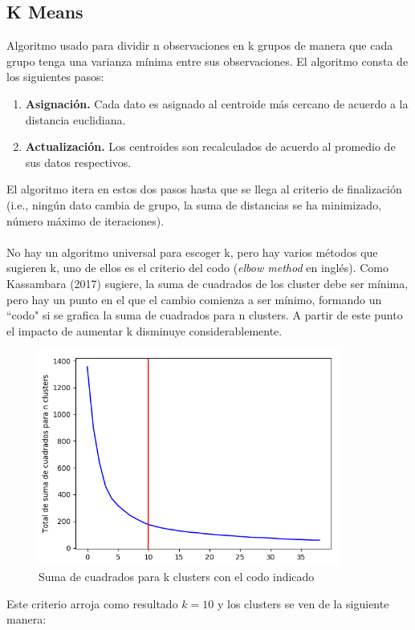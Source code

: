 \documentclass[12pt,spanish]{article}
\begin{document}
	\subsection{K Means}
	Algoritmo usado para dividir n observaciones en k grupos de manera que cada grupo tenga una varianza mínima entre sus observaciones. El algoritmo consta de los siguientes pasos:
	\begin{enumerate}
		\item \textbf{Asignación.} Cada dato es asignado al centroide más cercano de acuerdo a la distancia euclidiana.
		\item \textbf{Actualización.} Los centroides son recalculados de acuerdo al promedio de sus datos respectivos.
	\end{enumerate}
	El algoritmo itera en estos dos pasos hasta que se llega al criterio de finalización (i.e., ningún dato cambia de grupo, la suma de distancias se ha minimizado, número máximo de iteraciones).\\\\
	No hay un algoritmo universal para escoger k, pero hay varios métodos que sugieren k, uno de ellos es el criterio del codo (\textit{elbow method} en inglés). Como Kassambara (2017) sugiere, la suma de cuadrados de los cluster debe ser mínima, pero hay un punto en el que el cambio comienza a ser mínimo, formando un ``codo" si se grafica la suma de cuadrados para n clusters. A partir de este punto el impacto de aumentar k disminuye considerablemente.
	\begin{figure}[H]
		\centering
		\includegraphics[width=10cm]{Imagenes/kmeans_elbow.png}
		\begin{centering}
			\caption{Suma de cuadrados para k clusters con el codo indicado}
		\end{centering}
	\end{figure}
	Este criterio arroja como resultado $k=10$ y los clusters se ven de la siguiente manera:
\end{document}
